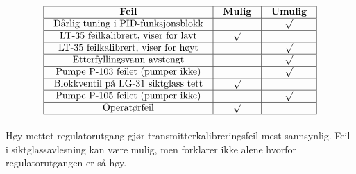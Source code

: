 
$$\vbox{\offinterlineskip
\halign{\strut
\vrule \quad\hfil # \ \hfil & 
\vrule \quad\hfil # \ \hfil & 
\vrule \quad\hfil # \ \hfil \vrule \cr
\noalign{\hrule}
%
{\bf Feil} & {\bf Mulig} & {\bf Umulig} \cr
%
\noalign{\hrule}
%
Dårlig tuning i PID-funksjonsblokk &  & $\surd$ \cr
%
\noalign{\hrule}
%
LT-35 feilkalibrert, viser for lavt & $\surd$ &  \cr
%
\noalign{\hrule}
%
LT-35 feilkalibrert, viser for høyt &  & $\surd$ \cr
%
\noalign{\hrule}
%
Etterfyllingsvann avstengt &  & $\surd$ \cr
%
\noalign{\hrule}
%
Pumpe P-103 feilet (pumper ikke) &  & $\surd$ \cr
%
\noalign{\hrule}
%
Blokkventil på LG-31 siktglass tett & $\surd$ &  \cr
%
\noalign{\hrule}
%
Pumpe P-105 feilet (pumper ikke) &  & $\surd$ \cr
%
\noalign{\hrule}
%
Operatørfeil & $\surd$ &  \cr
%
\noalign{\hrule}
} %
}$$ %

Høy mettet regulatorutgang gjør transmitterkalibreringsfeil mest sannsynlig. Feil i siktglassavlesning kan være mulig, men forklarer ikke alene hvorfor regulatorutgangen er så høy.



